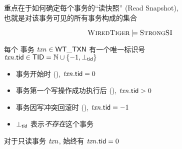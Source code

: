 
\begin{frame}{}
\end{frame}

\begin{frame}{}
  \begin{center}

	\vspace{0.20cm}
	重点在于如何确定每个事务的``读快照'' (Read Snapshot), \\[5pt]
	也就是对该事务可见的所有事务构成的集合
  \end{center}
\end{frame}

\begin{frame}{}

  \[
	\textsc{WiredTiger} \models \textsc{StrongSI}
  \]
\end{frame}

\begin{frame}{}
  \begin{center}
	每个 \wtalg{} 事务 $\mathit{txn} \in {\sf WT\_TXN}$ 有一个唯一标识号 \\[5pt]
	$\mathit{txn}.{\sf tid} \in {\sf TID} = \mathbb{N} \cup \{-1, \bot_{{\sf tid}}\}$
  \end{center}

  \vspace{0.50cm}
  \begin{itemize}
	\setlength{\itemsep}{10pt}
	\item 事务开始时 (\wtstart), $\mathit{txn}.{\sf tid} = 0$
	\item 事务第一个写操作成功执行后 (\wtupdate), $\mathit{txn}.{\sf tid} > 0$
	\item 事务因写冲突回滚时 (\wtrollback), $\mathit{txn}.{\sf tid} = -1$
	\item $\bot_{{\sf tid}}$ 表示\emph{不存在}这个事务
  \end{itemize}

  \pause
  \vspace{0.20cm}
  \begin{center}
	对于只读事务 $\mathit{txn}$, 始终有 $\mathit{txn}.{\sf tid} = 0$
  \end{center}
\end{frame}

